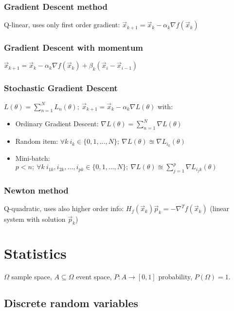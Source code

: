 \documentclass[]{article}
\begin{document}
	\subsubsection{Gradient Descent method}
		
	Q-linear, uses only first order gradient: $\vec{x}_{k+1} = \vec{x}_k - \alpha_k \nabla f(\vec{x}_k)$
	
	\subsubsection{Gradient Descent with momentum}
	
	$\vec{x}_{k+1} = \vec{x}_k - \alpha_k \nabla f(\vec{x}_k) + \beta_k (\vec{x}_i - \vec{x}_{i-1})$
	
	\subsubsection{Stochastic Gradient Descent}
	
	$L(\theta)=\sum\limits_{n=1}^N L_n(\theta); \ \vec{x}_{k+1} = \vec{x}_k - \alpha_k \nabla L(\theta)$ with:
	\begin{itemize}
		\item Ordinary Gradient Descent: $\nabla L(\theta) = \sum\limits_{n=1}^N \nabla L(\theta)$ 
		\item Random item: $\forall k \ i_k\in\{0,1,\dots,N\}; \ \nabla L(\theta) \approxeq \nabla L_{i_k}(\theta)$
		\item Mini-batch: $p < n; \ \forall k \ i_{1k},i_{2k},\dots,i_{pk}\in\{0,1,\dots,N\}; \ \nabla L(\theta) \approxeq \sum\limits_{j=1}^p \nabla L_{i_jk}(\theta)$
	\end{itemize}
	 
	
	\subsubsection{Newton method}
	
	Q-quadratic, uses also higher order info:
	$H_f(\vec{x}_k)\vec{p}_k = -\nabla^T f(\vec{x}_k)$ (linear system with solution $\vec{p}_k$)
	
	
	\section{Statistics}
	
	$\Omega$ sample space, $A \subseteq \Omega$ event space, $P:A\to[0,1]$ probability, $P(\Omega)=1$.
	
	\subsection{Discrete random variables}
	
\end{document}
